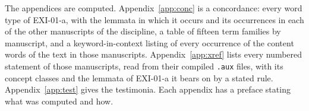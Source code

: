 The appendices are computed. Appendix~\ref{app:conc} is a concordance: every word type of EXI-01-a, with the lemmata in which it occurs and its occurrences in each of the other \cnOtherMss{} manuscripts of the discipline, a table of fifteen term families by manuscript, and a keyword-in-context listing of every occurrence of the content words of the text in those manuscripts. Appendix~\ref{app:xref} lists every numbered statement of those manuscripts, read from their compiled \texttt{.aux} files, with its concept classes and the lemmata of EXI-01-a it bears on by a stated rule. Appendix~\ref{app:test} gives the testimonia. Each appendix has a preface stating what was computed and how.
